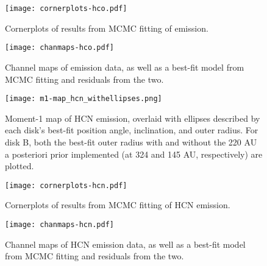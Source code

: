 



\begin{figure}[htp]
  \hspace*{\fill}%
  \texttt{[image: cornerplots-hco.pdf]}\hfill%
  \hspace*{\fill}%
  \caption{Cornerplots of results from MCMC fitting of \hco emission.}
  \label{fig:hco_cornerplots}
\end{figure}



\begin{figure}[htp]
  \hspace*{\fill}%
  \texttt{[image: chanmaps-hco.pdf]}\hfill%
  \hspace*{\fill}%
  \caption{Channel maps of \hco emission data, as well as a best-fit model from MCMC fitting and residuals from the two.}
  \label{fig:hco_chanmaps}
\end{figure}


\begin{figure}[htp]
  \hspace*{\fill}%
  \texttt{[image: m1-map\_hcn\_withellipses.png]}\hfill%
  \hspace*{\fill}%
  \caption{Moment-1 map of HCN emission, overlaid with ellipses described by each disk's best-fit position angle, inclination, and outer radius. For disk B, both the best-fit outer radius with and without the 220 AU a posteriori prior implemented (at 324 and 145 AU, respectively) are plotted.}
  \label{fig:hcn_m1_ellipses}
\end{figure}


\begin{figure}[htp]
  \hspace*{\fill}%
  \texttt{[image: cornerplots-hcn.pdf]}\hfill%
  \hspace*{\fill}%
  \caption{Cornerplots of results from MCMC fitting of HCN emission.}
  \label{fig:hcn_cornerplots}
\end{figure}



\begin{figure}[htp]
  \hspace*{\fill}%
  \texttt{[image: chanmaps-hcn.pdf]}\hfill%
  \hspace*{\fill}%
  \caption{Channel maps of HCN emission data, as well as a best-fit model from MCMC fitting and residuals from the two.}
  \label{fig:hcn_chanmaps}
\end{figure}



